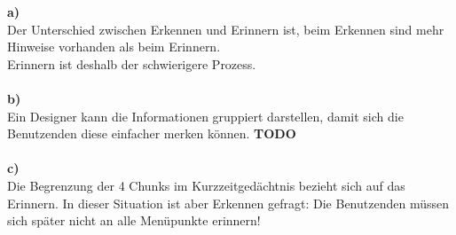 
\textbf{a)}\\
Der Unterschied zwischen Erkennen und Erinnern ist, beim Erkennen sind mehr Hinweise vorhanden als beim Erinnern. 
\\Erinnern ist deshalb der schwierigere Prozess.
\\\\
\textbf{b)}\\
Ein Designer kann die Informationen gruppiert darstellen, damit sich die Benutzenden diese einfacher merken können.
\textbf{TODO}
\\\\
\textbf{c)}\\
Die Begrenzung der 4 Chunks im Kurzzeitgedächtnis bezieht sich auf das Erinnern.
In dieser Situation ist aber Erkennen gefragt: 
Die Benutzenden müssen sich später nicht an alle Menüpunkte erinnern!